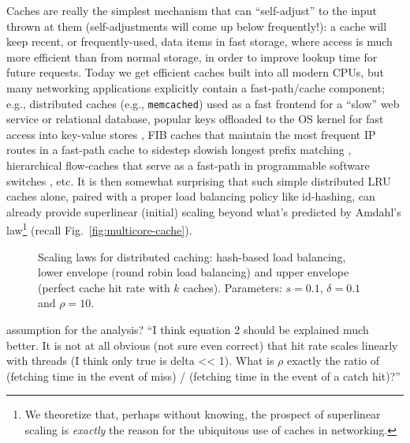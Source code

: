 Caches are really the simplest mechanism that can ``self-adjust'' to the input thrown at them (self-adjustments will come up below frequently!): a cache will keep recent, or frequently-used, data items in fast storage, where access is much more efficient than from normal storage, in order to improve lookup time for future requests. Today we get efficient caches built into all modern CPUs, but many networking applications explicitly contain a fast-path\slash cache component; e.g., distributed caches (e.g., \texttt{memcached}) used as a fast frontend for a ``slow'' web service or relational database, popular keys offloaded to the OS kernel for fast access into key-value stores \cite{179747, ghigoff2021bmc}, FIB caches that maintain the most frequent IP routes in a fast-path cache to sidestep slowish longest prefix matching \cite{rottenstreich2016optimal}, hierarchical flow-caches that serve as a fast-path in programmable software switches \cite{188960}, etc. It is then somewhat surprising that such simple distributed LRU caches alone, paired with a proper load balancing policy like id-hashing, can already provide superlinear (initial) scaling beyond what's predicted by Amdahl's law\footnote{We theoretize that, perhaps without knowing, the prospect of superlinear scaling is \emph{exactly} the reason for the ubiquitous use of caches in networking.} (recall Fig.~\ref{fig:multicore-cache}).








\begin{figure}[t]
  \centering
  \begin{small}
    
\end{small}
\caption{Scaling laws for distributed caching: hash-based load balancing, lower envelope (round robin load balancing) and upper envelope (perfect cache hit rate with $k$ caches). Parameters: $s=0.1$, $\delta=0.1$ and $\rho=10$.}
  \label{fig:dcache-analysis}
\end{figure}


assumption for the analysis? ``I think equation 2 should be explained much better. It is not at all obvious (not sure even correct) that hit rate scales linearly with threads (I think only true is delta << 1). What is $\rho$ exactly the ratio of (fetching time in the event of miss) / (fetching time in the event of a catch hit)?''

